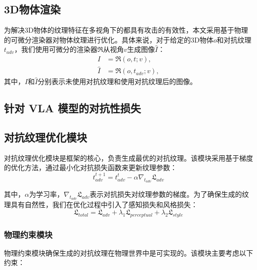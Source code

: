 


\subsection{3D物体渲染}

为解决3D物体的纹理特征在多视角下的都具有攻击的有效性，本文采用基于物理的可微分渲染器对物体纹理进行优化。具体来说，对于给定的3D物体$o$和对抗纹理$t_{adv}$，我们使用可微分的渲染器$\mathfrak{R}$从视角$v$生成图像$\hat{I}$： 
\begin{align}
    I &= \mathfrak{R}(o, t; v),\\
    \hat{I} &= \mathfrak{R}(o, t_{adv}; v),
\end{align}
其中，$I$和$\hat{I}$分别表示未使用对抗纹理和使用对抗纹理后的图像。

\subsection{针对 VLA 模型的对抗性损失}

\subsection{对抗纹理优化模块}
对抗纹理优化模块是框架的核心，负责生成最优的对抗纹理。该模块采用基于梯度的优化方法，通过最小化对抗损失函数来更新纹理参数：
\begin{equation}
    t_{adv}^{t+1} = t_{adv}^t - \alpha \nabla_{t_{adv}} \mathfrak{L}_{adv}
\end{equation}

其中，$\alpha$为学习率，$\nabla_{t_{adv}} \mathfrak{L}_{adv}$表示对抗损失对纹理参数的梯度。为了确保生成的纹理具有自然性，我们在优化过程中引入了感知损失和风格损失：
\begin{equation}
    \mathfrak{L}_{total} = \mathfrak{L}_{adv} + \lambda_1\mathfrak{L}_{perceptual} + \lambda_2\mathfrak{L}_{style}
\end{equation}

\subsubsection{物理约束模块}
物理约束模块确保生成的对抗纹理在物理世界中是可实现的。该模块主要考虑以下约束：

